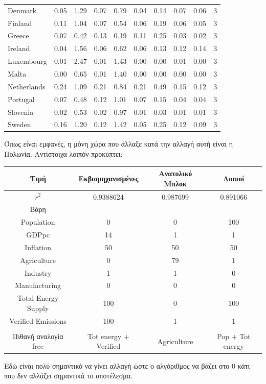 \documentclass[a4paper,twoside,10pt]{article}
\begin{document}
\begin{table}[ht]
\begin{tabular}{lrrrrrrrrr}
		 Denmark & 0.05 & 1.29 & 0.07 & 0.79 & 0.04 & 0.14 & 0.07 & 0.06 &   3 \\ 
		 Finland & 0.11 & 1.04 & 0.07 & 0.54 & 0.06 & 0.19 & 0.06 & 0.05 &   3 \\ 
		 Greece & 0.07 & 0.42 & 0.13 & 0.19 & 0.11 & 0.25 & 0.03 & 0.02 &   3 \\ 
		 Ireland & 0.04 & 1.56 & 0.06 & 0.62 & 0.06 & 0.13 & 0.12 & 0.14 &   3 \\ 
		 Luxembourg & 0.01 & 2.47 & 0.01 & 1.43 & 0.00 & 0.00 & 0.01 & 0.00 &   3 \\ 
		 Malta & 0.00 & 0.65 & 0.01 & 1.40 & 0.00 & 0.00 & 0.00 & 0.00 &   3 \\ 
		 Netherlands & 0.24 & 1.09 & 0.21 & 0.84 & 0.21 & 0.49 & 0.15 & 0.12 &   3 \\ 
		 Portugal & 0.07 & 0.48 & 0.12 & 1.01 & 0.07 & 0.15 & 0.04 & 0.04 &   3 \\ 
		 Slovenia & 0.02 & 0.53 & 0.02 & 0.97 & 0.01 & 0.03 & 0.01 & 0.01 &   3 \\ 
		 Sweden & 0.16 & 1.20 & 0.12 & 1.42 & 0.05 & 0.25 & 0.12 & 0.09 &   3 \\ 
		\hline
	\end{tabular}
\end{table}
Όπως είναι εμφανές, η μόνη χώρα που άλλαξε κατά την αλλαγή αυτή είναι η Πολωνία. Αντίστοιχα λοιπόν προκύπτει:

\begin{table}[H]
	\centering
	\begin{tabular}{|c|c|c|c|}
		\hline
		Τιμή & Εκβιομηχανισμένες & Ανατολικό Μπλοκ & Λοιποί \\
		\hline
		$r^2$ & 0.9388624 & 0.987699 & 0.891066 \\
		\hline
		Βάρη &  &  &  \\
		\hline
		Population & 0 & 0 & 100 \\
		\hline
		GDPpc & 14 & 1 & 1 \\
		\hline
		Inflation & 50 & 50 & 50 \\
		\hline
		Agriculture & 0 & 79 & 1 \\
		\hline
		Industry & 1 & 1 & 0 \\
		\hline
		Manufacturing & 0 & 0 & 0 \\
		\hline
		Total Energy Supply & 100 & 0 & 100 \\
		\hline
		Verified Emissions & 100 & 1 & 1 \\
		\hline
		&  &  &  \\
		\hline
		Πιθανή αναλογία free & Tot energy + Verified & Agriculture & Pop + Tot energy  \\
		\hline
	\end{tabular}
\end{table}
Εδώ είναι πολύ σημαντικό να γίνει αλλαγή ώστε ο αλγόριθμος να βάζει στο 0 κάτι που δεν αλλάζει σημαντικά το αποτέλεσμα.
\end{document}
